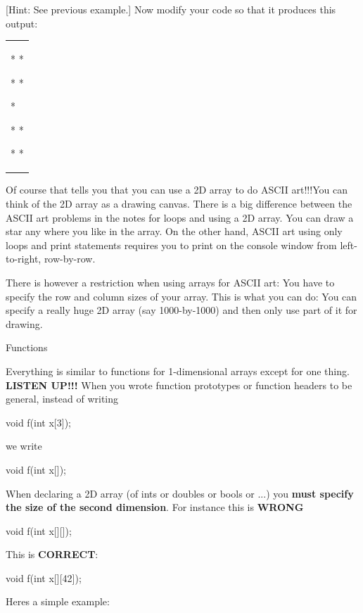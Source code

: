 {[}Hint: See previous example.{]} Now modify your code so that it
produces this output:

\begin{longtable}[]{@{}
  >{\raggedright\arraybackslash}p{}@{}}
\toprule\noalign{}
 \\
\midrule\noalign{}
\endhead
\bottomrule\noalign{}
\endlastfoot
* *

* *

*

* *

* * \\
\end{longtable}

Of course that tells you that you can use a 2D array to do ASCII
art!!!You can think of the 2D array as a drawing canvas. There is a big
difference between the ASCII art problems in the notes for loops and
using a 2D array. You can draw a star any where you like in the array.
On the other hand, ASCII art using only loops and print statements
requires you to print on the console window from left-to-right,
row-by-row.

There is however a restriction when using arrays for ASCII art: You have
to specify the row and column sizes of your array. This is what you can
do: You can specify a really huge 2D array (say 1000-by-1000) and then
only use part of it for drawing.

Functions

Everything is similar to functions for 1-dimensional arrays except for
one thing. \textbf{LISTEN UP!!!} When you wrote function prototypes or
function headers to be general, instead of writing

void f(int x{[}3{]});

we write

void f(int x{[}{]});

When declaring a 2D array (of ints or doubles or bools or ...) you
\textbf{must specify the size of the second dimension}. For instance
this is \textbf{WRONG}

void f(int x{[}{]}{[}{]});

This is \textbf{CORRECT}:

void f(int x{[}{]}{[}42{]});

Here\textquotesingle s a simple example:


